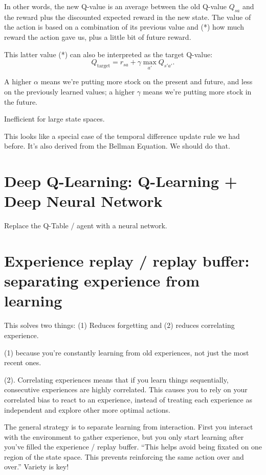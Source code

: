 \documentclass[12pt]{article}
\theoremstyle{plain}
\theoremstyle{definition}
\theoremstyle{remark}
\begin{document}
In other words, the new Q-value is an average between the old Q-value \( Q_{sa}
\) and the reward plus the discounted expected reward in the new state. The
value of the action is based on a combination of its previous value and (*) how much
reward the action gave us, plus a little bit of future reward.

This latter value (*) can also be interpreted as the target Q-value:
$$
Q_{\text{target}} = r_{sa} + \gamma \max_{a'} Q_{s'a'}.
$$

A higher \(\alpha \) means we're
putting more stock on the present and future, and less on the previously learned
values; a higher \( \gamma \) means we're putting more stock in the future.

Inefficient for large state spaces.

This looks like a special case of the temporal difference update rule we had
before. It's also derived from the Bellman Equation. We should do that.

\section{Deep Q-Learning: Q-Learning + Deep Neural Network}

Replace the Q-Table / agent with a neural network.

\section{Experience replay / replay buffer: separating experience from learning}

This solves two things: (1) Reduces forgetting and (2) reduces correlating experience.

(1) because you're constantly learning from old experiences, not just the most recent ones.

(2). Correlating experiences means that if you learn things sequentially,
consecutive experiences are highly correlated. This causes you to rely on your
correlated bias to react to an experience, instead of treating each experience
as independent and explore other more optimal actions.

The general strategy is to separate learning from interaction. First you interact with the environment to gather experience, but you only start learning after you've filled the experience / replay buffer. ``This helps avoid being fixated on one region of the state space. This prevents reinforcing the same action over and over.'' Variety is key!
\end{document}
